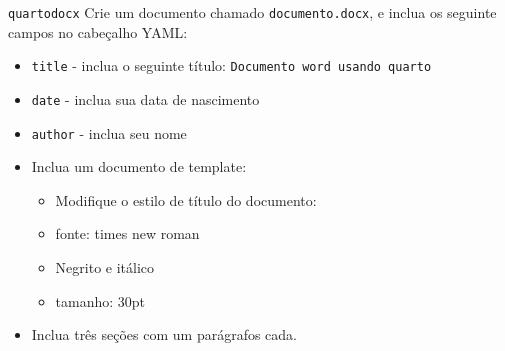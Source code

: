 \documentclass[
  10pt,
  ignorenonframetext,
]{beamer}
\providecommand{\tightlist}{%
  \setlength{\itemsep}{0pt}\setlength{\parskip}{0pt}}\usepackage{longtable,booktabs,array}
\begin{document}
\begin{frame}[fragile]{\texttt{quarto}\newline \texttt{docx}}
\protect\hypertarget{quartodocx-2}{}
Crie um documento chamado \texttt{documento.docx}, e inclua os seguinte
campos no cabeçalho YAML:

\begin{itemize}
\tightlist
\item
  \texttt{title} - inclua o seguinte título:
  \texttt{Documento\ word\ usando\ quarto}
\item
  \texttt{date} - inclua sua data de nascimento
\item
  \texttt{author} - inclua seu nome
\item
  Inclua um documento de template:

  \begin{itemize}
  \tightlist
  \item
    Modifique o estilo de título do documento:
  \item
    fonte: times new roman
  \item
    Negrito e itálico
  \item
    tamanho: 30pt
  \end{itemize}
\item
  Inclua três seções com um parágrafos cada.
\end{itemize}
\end{frame}
\end{document}
